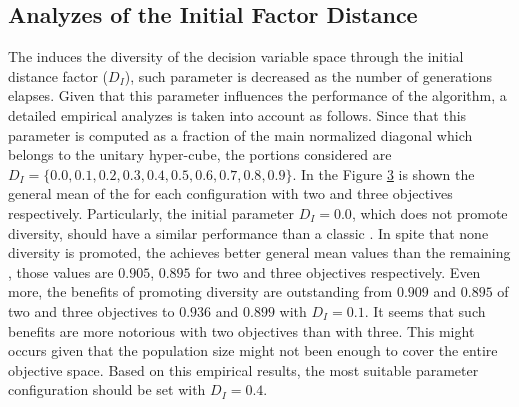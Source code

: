 \begin{figure}[t]
\centering

\label{fig:Diversity_2obj}
\end{figure}


\begin{figure}[t]
\centering

\label{fig:Diversity_3obj}
\end{figure}


%
\subsection{Analyzes of the Initial Factor Distance}

The \VSDMOEA{} induces the diversity of the decision variable space through the initial distance factor ($D_I$), such parameter is decreased as the number of generations elapses.
%
Given that this parameter influences the performance of the algorithm, a detailed empirical analyzes is taken into account as follows.
%
Since that this parameter is computed as a fraction of the main normalized diagonal which belongs to the unitary hyper-cube, the portions considered are $ D_I = \{0.0, 0.1, 0.2, 0.3, 0.4, 0.5, 0.6, 0.7, 0.8, 0.9\}$.
%
In the Figure \ref{fig:Initial-distance-factor} is shown the general mean of the \HV{} for each configuration with two and three objectives respectively.
%
Particularly, the initial parameter $D_I=0.0$, which does not promote diversity, should have a similar performance than a classic \MOEA{}.
%
In spite that none diversity is promoted, the \VSDMOEA{} achieves better general mean values than the remaining \MOEAS{}, those values are $0.905$, $0.895$ for two and three objectives respectively.
%
Even more, the benefits of promoting diversity are outstanding from $0.909$ and $0.895$ of two and three objectives to $0.936$ and $0.899$ with $D_I=0.1$.
%
It seems that such benefits are more notorious with two objectives than with three.
%
This might occurs given that the population size might not been enough to cover the entire objective space.
%
Based on this empirical results, the most suitable parameter configuration should be set with $D_I = 0.4$.
%
\begin{figure}[t]
\centering

\label{fig:Initial-distance-factor}
\end{figure}


